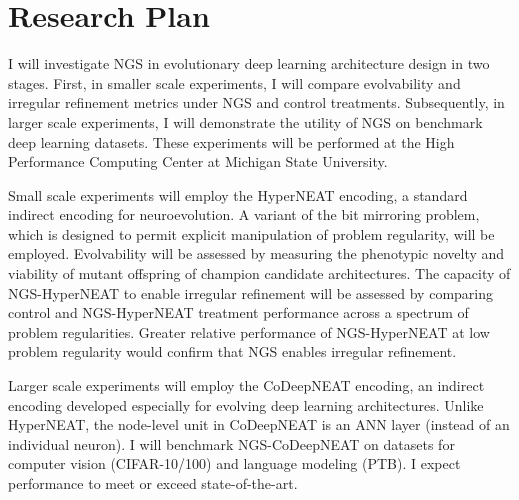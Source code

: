\section{Research Plan}

I will investigate NGS in evolutionary deep learning architecture design in two stages.
First, in smaller scale experiments, I will compare evolvability and irregular refinement metrics under NGS and control treatments. Subsequently, in larger scale experiments, I will demonstrate the utility of NGS on benchmark deep learning datasets.
These experiments will be performed at the High Performance Computing Center at Michigan State University.

Small scale experiments will employ the HyperNEAT encoding,\autocite{clune2011performance} a standard indirect encoding for neuroevolution.
A variant of the bit mirroring problem, which is designed to permit explicit manipulation of problem regularity, will be employed.
Evolvability will be assessed by measuring the phenotypic novelty and viability of mutant offspring of champion candidate architectures.
The capacity of NGS-HyperNEAT to enable irregular refinement will be assessed by comparing control and NGS-HyperNEAT treatment performance across a spectrum of problem regularities.
Greater relative performance of NGS-HyperNEAT at low problem regularity would confirm that NGS enables irregular refinement.

Larger scale experiments will employ the CoDeepNEAT encoding,\autocite{miikkulainen2017evolving} an indirect encoding developed especially for evolving deep learning architectures.
Unlike HyperNEAT, the node-level unit in CoDeepNEAT is an ANN layer (instead of an individual neuron).
I will benchmark NGS-CoDeepNEAT on datasets for computer vision (CIFAR-10/100) and language modeling (PTB).
I expect performance to meet or exceed state-of-the-art.
